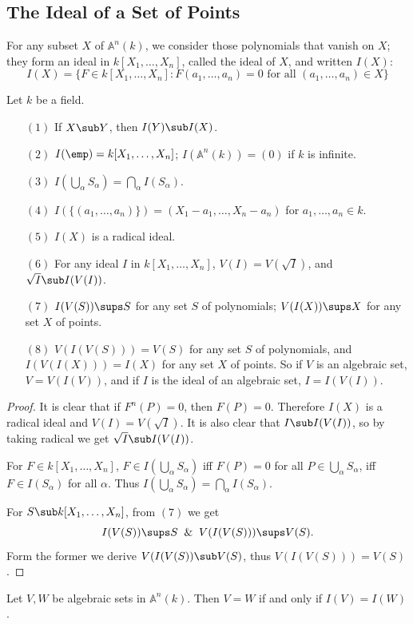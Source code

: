 \subsection{The Ideal of a Set of Points}
For any subset $X$ of $\mathbb{A}^n(k)$, we consider those polynomials that vanish on $X$; they form an ideal in $k[X_1,\dots,X_n]$, called the ideal of $X$, and written $I(X)$:
\[I(X)=\{F\in k[X_1,\dots,X_n]:F(a_1,\dots,a_n)=0\text{ for all }(a_1,\dots,a_n)\in X\}\]
\begin{proposition}
Let $k$ be a field.
\begin{itemize}
\item[$(1)$] If $X\sub Y$, then $I(Y)\sub I(X)$.
\item[$(2)$] $I(\emp)=k[X_1,\dots,X_n]$; $I(\mathbb{A}^n(k))=(0)$ if $k$ is infinite. 
\item[$(3)$] $I(\bigcup_\alpha S_\alpha)=\bigcap_\alpha I(S_\alpha)$.
\item[$(4)$] $I(\{(a_1,\dots,a_n)\})=(X_1-a_1,\dots,X_n-a_n)$ for $a_1,\dots,a_n\in k$.
\item[$(5)$] $I(X)$ is a radical ideal.
\item[$(6)$] For any ideal $I$ in $k[X_1,\dots,X_n]$, $V(I)=V(\sqrt{I})$, and $\sqrt{I}\sub I(V(I))$.
\item[$(7)$] $I(V(S))\sups S$ for any set $S$ of polynomials; $V(I(X))\sups X$ for any set $X$ of points.
\item[$(8)$] $V(I(V(S)))=V(S)$ for any set $S$ of polynomials, and $I(V(I(X)))=I(X)$ for any set $X$ of points. So if $V$ is an algebraic set, $V=V(I(V))$, and if $I$ is the ideal of an algebraic set, $I=I(V(I))$.
\end{itemize}
\end{proposition}
\begin{proof}
It is clear that if $F^n(P)=0$, then $F(P)=0$. Therefore $I(X)$ is a radical ideal and $V(I)=V(\sqrt{I})$. It is also clear that $I\sub I(V(I))$, so by taking radical we get $\sqrt{I}\sub I(V(I))$.\par
For $F\in k[X_1,\dots,X_n]$, $F\in I(\bigcup_\alpha S_\alpha)$ iff $F(P)=0$ for all $P\in\bigcup_\alpha S_\alpha$, iff $F\in I(S_\alpha)$ for all $\alpha$. Thus $I(\bigcup_\alpha S_\alpha)=\bigcap_\alpha I(S_\alpha)$.\par
For $S\sub k[X_1,\dots,X_n]$, from $(7)$ we get
\[I(V(S))\sups S\And V(I(V(S)))\sups V(S).\] 
Form the former we derive $V(I(V(S))\sub V(S)$, thus $V(I(V(S)))=V(S)$.
\end{proof}
\begin{corollary}
Let $V,W$ be algebraic sets in $\mathbb{A}^n(k)$. Then $V=W$ if and only if $I(V)=I(W)$.
\end{corollary}
